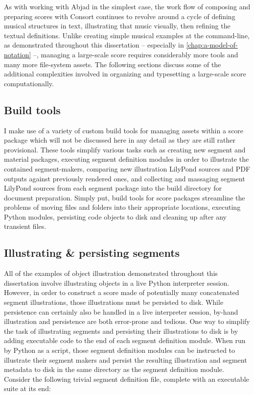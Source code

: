 As with working with Abjad in the simplest case, the work flow of composing and
preparing scores with Consort continues to revolve around a cycle of defining
musical structures in text, illustrating that music visually, then refining the
textual definitions. Unlike creating simple musical examples at the
command-line, as demonstrated throughout this dissertation -- especially in
\autoref{chap:a-model-of-notation} --, managing a large-scale score requires
considerably more tools and many more file-system assets. The following
sections discuss some of the additional complexities involved in organizing and
typesetting a large-scale score computationally.

\subsection{Build tools}
\label{ssec:build-tools}

I make use of a variety of custom build tools for managing assets within a
score package which will not be discussed here in any detail as they are still
rather provisional. These tools simplify various tasks such as creating new
segment and material packages, executing segment definition modules in order to
illustrate the contained segment-makers, comparing new illustration LilyPond
sources and PDF outputs against previously rendered ones, and collecting and
massaging segment LilyPond sources from each segment package into the build
directory for document preparation. Simply put, build tools for score packages
streamline the problems of moving files and folders into their appropriate
locations, executing Python modules, persisting code objects to disk and
cleaning up after any transient files.

\subsection{Illustrating \& persisting segments}
\label{ssec:illustrating-and-persisting-segments}

All of the examples of object illustration demonstrated throughout this
dissertation involve illustrating objects in a live Python interpreter session.
However, in order to construct a score made of potentially many concatenated
segment illustrations, those illustrations must be persisted to disk. While
persistence can certainly also be handled in a live interpreter session,
by-hand illustration and persistence are both error-prone and tedious. One way
to simplify the task of illustrating segments and persisting their
illustrations to disk is by adding executable code to the end of each segment
definition module. When run by Python as a script, those segment definition
modules can be instructed to illustrate  their segment makers and persist the
resulting illustration and segment metadata to disk in the same directory as
the segment definition module. Consider the following trivial segment
definition file, complete with an executable suite at its end:

